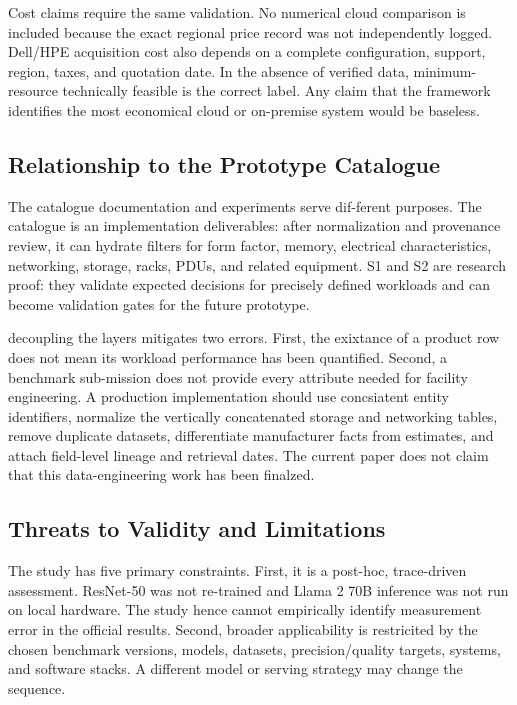 \documentclass[final,3p,12pt,nopreprintline]{elsarticle}
\begin{document}
Cost claims require the same validation. No numerical cloud comparison is included because the exact regional price record was not independently logged. Dell/HPE acquisition cost also depends on a complete configuration, support, region, taxes, and quotation date. In the absence of verified data, minimum-resource technically feasible is the correct label. Any claim that the framework identifies the  most economical cloud or on-premise system would be baseless.


\subsection{Relationship to the Prototype Catalogue}


The catalogue documentation and experiments serve dif-ferent purposes. The catalogue is an implementation deliverables: after normalization and provenance review, it can hydrate filters for form factor, memory, electrical characteristics, networking, storage, racks, PDUs, and related equipment. S1 and S2 are research proof: they validate expected decisions for precisely defined workloads and can become validation gates for the future prototype.


decoupling the layers mitigates two errors. First, the exixtance of a product row does not mean its workload performance has been quantified. Second, a benchmark sub-mission does not provide every attribute needed for facility engineering. A production implementation should use concsiatent entity identifiers, normalize the vertically concatenated storage and networking tables, remove duplicate datasets, differentiate manufacturer facts from estimates, and attach field-level lineage and retrieval dates. The current paper does not claim that this data-engineering work has been finalzed.


\subsection{Threats to Validity and Limitations}


The study has five primary constraints. First, it is a post-hoc, trace-driven assessment. ResNet-50 was not re-trained and Llama 2 70B inference was not run on local hardware. The study hence cannot empirically identify measurement error in the official results. Second, broader applicability is restricited by the chosen benchmark versions, models, datasets, precision/quality targets, systems, and software stacks. A different model or serving strategy may change the sequence.
\end{document}
